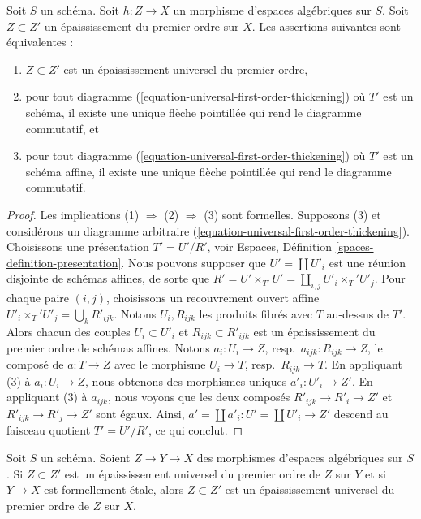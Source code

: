 \begin{lemma}
\label{lemma-check-universal-first-order-thickening}
Soit $S$ un schéma.
Soit $h : Z \to X$ un morphisme d'espaces algébriques sur $S$.
Soit $Z \subset Z'$ un épaississement du premier ordre sur $X$.
Les assertions suivantes sont équivalentes :
\begin{enumerate}
\item $Z \subset Z'$ est un épaississement universel du premier ordre,
\item pour tout diagramme (\ref{equation-universal-first-order-thickening})
où $T'$ est un schéma, il existe une unique flèche pointillée qui rend le diagramme commutatif, et
\item pour tout diagramme (\ref{equation-universal-first-order-thickening})
où $T'$ est un schéma affine, il existe une unique flèche pointillée qui rend le
diagramme commutatif.
\end{enumerate}
\end{lemma}

\begin{proof}
Les implications (1) $\Rightarrow$ (2) $\Rightarrow$ (3) sont formelles.
Supposons (3) et considérons un diagramme arbitraire
(\ref{equation-universal-first-order-thickening}).
Choisissons une présentation $T' = U'/R'$, voir
Espaces, Définition \ref{spaces-definition-presentation}.
Nous pouvons supposer que $U' = \coprod U'_i$ est une réunion disjointe
de schémas affines, de sorte que $R' = U' \times_{T'} U' = \coprod_{i, j} U'_i \times_T' U'_j$.
Pour chaque paire $(i, j)$, choisissons un recouvrement ouvert affine
$U'_i \times_T' U'_j = \bigcup_k R'_{ijk}$. Notons $U_i, R_{ijk}$
les produits fibrés avec $T$ au-dessus de $T'$. Alors chacun des couples
$U_i \subset U'_i$ et $R_{ijk} \subset R'_{ijk}$
est un épaississement du premier ordre de schémas affines.
Notons $a_i : U_i \to Z$, resp.\ $a_{ijk} : R_{ijk} \to Z$,
le composé de $a : T \to Z$ avec le morphisme
$U_i \to T$, resp.\ $R_{ijk} \to T$.
En appliquant (3) à $a_i : U_i \to Z$,
nous obtenons des morphismes uniques $a'_i : U'_i \to Z'$.
En appliquant (3) à $a_{ijk}$, nous voyons que les deux composés
$R'_{ijk} \to R'_i \to Z'$ et $R'_{ijk} \to R'_j \to Z'$
sont égaux. Ainsi, $a' = \coprod a'_i : U' = \coprod U'_i \to Z'$
descend au faisceau quotient $T' = U'/R'$, ce qui conclut.
\end{proof}

\begin{lemma}
\label{lemma-universal-thickening-over-formally-etale}
Soit $S$ un schéma.
Soient $Z \to Y \to X$ des morphismes d'espaces algébriques sur $S$.
Si $Z \subset Z'$ est un épaississement universel du premier ordre de
$Z$ sur $Y$ et si $Y \to X$ est formellement étale, alors $Z \subset Z'$ est
un épaississement universel du premier ordre de $Z$ sur $X$.
\end{lemma}

